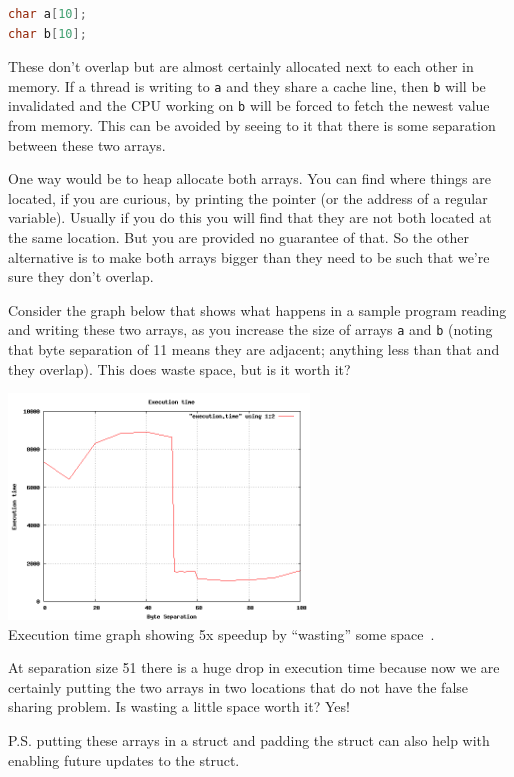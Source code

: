 \documentclass[a4paper]{report}
\begin{document}
\begin{lstlisting}[language=C]
char a[10];
char b[10];
\end{lstlisting}
These don't overlap but are almost certainly allocated next to each other in memory. If a thread is writing to \texttt{a} and they share a cache line, then \texttt{b} will be invalidated and the CPU working on \texttt{b} will be forced to fetch the newest value from memory. This can be avoided by seeing to it that there is some separation between these two arrays.

One way would be to heap allocate both arrays. You can find where things are located, if you are curious, by printing the pointer (or the address of a regular variable). Usually if you do this you will find that they are not both located at the same location. But you are provided no guarantee of that. So the other alternative is to make both arrays bigger than they need to be such that we're sure they don't overlap.

Consider the graph below that shows what happens in a sample program reading and writing these two arrays, as you increase the size of arrays \texttt{a} and \texttt{b} (noting that byte separation of 11 means they are adjacent; anything less than that and they overlap). This does waste space, but is it worth it?

\begin{center}
\includegraphics[width=0.6\textwidth]{images/falsesharing.png}\\
Execution time graph showing 5x speedup by ``wasting'' some space~\cite{falsesharing}.
\end{center}

At separation size 51 there is a huge drop in execution time because now we are certainly putting the two arrays in two locations that do not have the false sharing problem. Is wasting a little space worth it? Yes!

P.S. putting these arrays in a struct and padding the struct can also help with enabling future updates to the struct.
\end{document}
